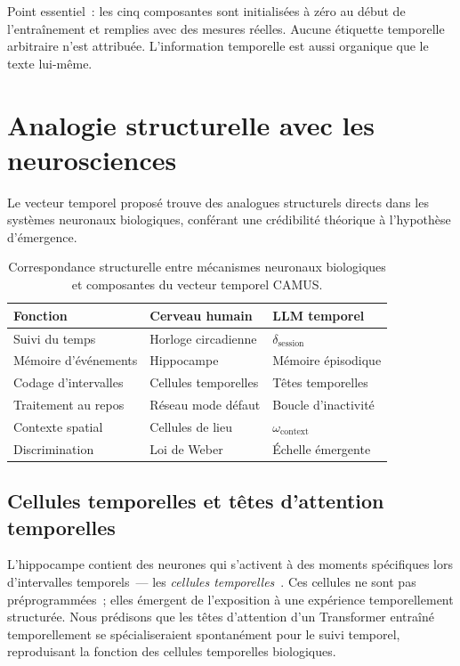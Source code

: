 \documentclass[10pt,twocolumn,letterpaper]{article}
\begin{document}
Point essentiel~: les cinq composantes sont initialis\'ees \`a z\'ero au d\'ebut de l'entra\^inement et remplies avec des mesures r\'eelles. Aucune \'etiquette temporelle arbitraire n'est attribu\'ee. L'information temporelle est aussi organique que le texte lui-m\^eme.

\section{Analogie structurelle avec les neurosciences}

Le vecteur temporel propos\'e trouve des analogues structurels directs dans les syst\`emes neuronaux biologiques, conf\'erant une cr\'edibilit\'e th\'eorique \`a l'hypoth\`ese d'\'emergence.

\begin{table}[H]
\centering
\caption{Correspondance structurelle entre m\'ecanismes neuronaux biologiques et composantes du vecteur temporel CAMUS.}
\label{tab:analogy}
\small
\begin{tabular}{@{}lll@{}}
\toprule
\textbf{Fonction} & \textbf{Cerveau humain} & \textbf{LLM temporel} \\
\midrule
Suivi du temps & Horloge circadienne & $\delta_{\text{session}}$ \\
M\'emoire d'\'ev\'enements & Hippocampe & M\'emoire \'episodique \\
Codage d'intervalles & Cellules temporelles & T\^etes temporelles \\
Traitement au repos & R\'eseau mode d\'efaut & Boucle d'inactivit\'e \\
Contexte spatial & Cellules de lieu & $\omega_{\text{context}}$ \\
Discrimination & Loi de Weber & \'Echelle \'emergente \\
\bottomrule
\end{tabular}
\end{table}

\subsection{Cellules temporelles et t\^etes d'attention temporelles}

L'hippocampe contient des neurones qui s'activent \`a des moments sp\'ecifiques lors d'intervalles temporels~--- les \emph{cellules temporelles}~\cite{macdonald2011}. Ces cellules ne sont pas pr\'eprogramm\'ees~; elles \'emergent de l'exposition \`a une exp\'erience temporellement structur\'ee. Nous pr\'edisons que les t\^etes d'attention d'un Transformer entra\^in\'e temporellement se sp\'ecialiseraient spontan\'ement pour le suivi temporel, reproduisant la fonction des cellules temporelles biologiques.
\end{document}
